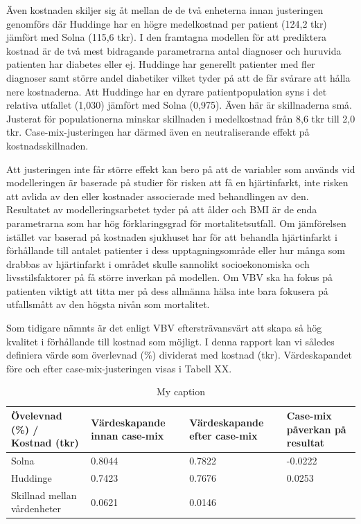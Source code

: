 Även kostnaden skiljer sig åt mellan de de två enheterna innan justeringen genomförs där Huddinge har en högre medelkostnad per patient (124,2 tkr) jämfört med Solna (115,6 tkr). I den framtagna modellen för att prediktera kostnad är de två mest bidragande parametrarna antal diagnoser och huruvida patienten har diabetes eller ej. Huddinge har generellt patienter med fler diagnoser samt större andel diabetiker vilket tyder på att de får svårare att hålla nere kostnaderna. Att Huddinge har en dyrare patientpopulation syns i det relativa utfallet (1,030) jämfört med Solna (0,975). Även här är skillnaderna små. Justerat för populationerna minskar skillnaden i medelkostnad från 8,6 tkr till 2,0 tkr. Case-mix-justeringen har därmed även en neutraliserande effekt på kostnadsskillnaden.

Att justeringen inte får större effekt kan bero på att de variabler som används vid modelleringen är baserade på studier för risken att få en hjärtinfarkt, inte risken att avlida av den eller kostnader associerade med behandlingen av den. Resultatet av modelleringsarbetet tyder på att ålder och BMI är de enda parametrarna som har hög förklaringsgrad för mortalitetsutfall. Om jämförelsen istället var baserad på kostnaden sjukhuset har för att behandla hjärtinfarkt i förhållande till antalet patienter i dess upptagningsområde eller hur många som drabbas av hjärtinfarkt i området skulle sannolikt socioekonomiska och livsstilsfaktorer på få större inverkan på modellen. Om VBV ska ha fokus på patienten viktigt att titta mer på dess allmänna hälsa inte bara fokusera på utfallsmått av den högsta nivån som mortalitet.

Som tidigare nämnts är det enligt VBV eftersträvansvärt att skapa så hög kvalitet i förhållande till kostnad som möjligt. I denna rapport kan vi således definiera värde som överlevnad (\%) dividerat med kostnad (tkr). Värdeskapandet före och efter case-mix-justeringen visas i Tabell XX.

\begin{table}[h]
\centering
\caption{My caption}
\label{my-label}
\begin{tabular}{|p{3cm}|p{3cm}|p{2.5cm}|p{2.5cm}|}
\hline
Övelevnad (\%) / Kostnad (tkr)           & Värdeskapande innan case-mix & Värdeskapande efter case-mix & Case-mix påverkan på resultat \\ \hline
Solna                       & 0.8044                       & 0.7822                       & -0.0222                       \\ \hline
Huddinge                    & 0.7423                       & 0.7676                       & 0.0253                        \\ \hline
Skillnad mellan vårdenheter & 0.0621                       & 0.0146                       &                               \\ \hline
\end{tabular}
\end{table}

